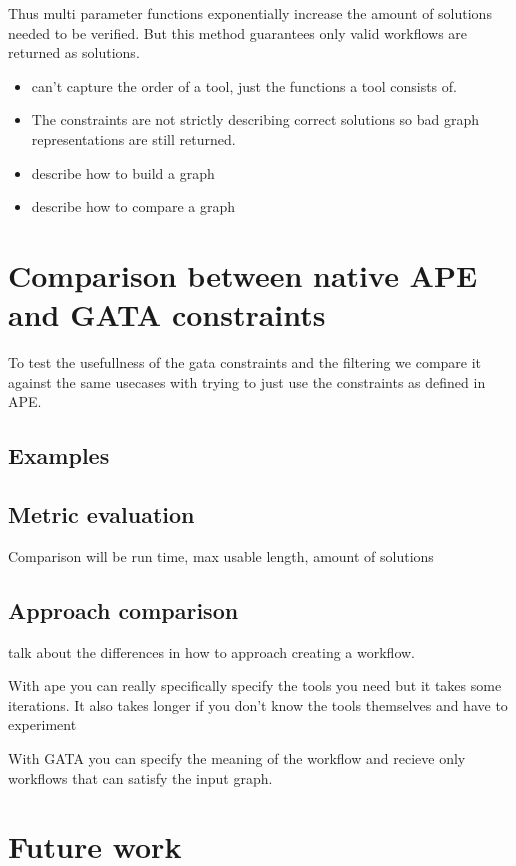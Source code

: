 \documentclass{article}
\begin{document}
Thus multi parameter functions exponentially increase the amount of solutions needed to be verified. But this method guarantees only valid workflows are returned as solutions. 

\begin{itemize}
    \item can't capture the order of a tool, just the functions a tool consists of.
    \item The constraints are not strictly describing correct solutions so bad graph representations are still returned.
    \item describe how to build a graph 
    \item describe how to compare a graph 
\end{itemize}


\section{Comparison between native APE and GATA constraints}
To test the usefullness of the gata constraints and the filtering we compare it against the same usecases with trying to just use the constraints as defined in APE.

\subsection{Examples}

\subsection{Metric evaluation}
 Comparison will be run time, max usable length, amount of solutions

\subsection{Approach comparison}
 talk about the differences in how to approach creating a workflow. 

 With ape you can really specifically specify the tools you need but it takes some iterations. It also takes longer if you don't know the tools themselves and have to experiment 

 With GATA you can specify the meaning of the workflow and recieve only workflows that can satisfy the input graph. 






\section{Future work}
\end{document}
